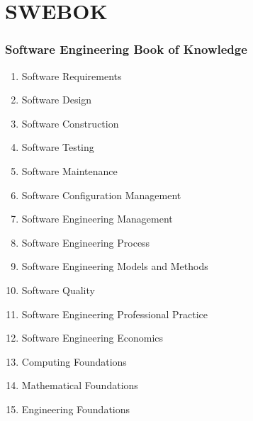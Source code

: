 \documentclass{../../slides-style}
\begin{document}
    \section{SWEBOK}

    \begin{frame}
        \frametitle{Software Engineering Book of Knowledge}
        \begin{footnotesize}
            \begin{enumerate}
                \item Software Requirements
                \item Software Design
                \item Software Construction
                \item Software Testing
                \item Software Maintenance
                \item Software Configuration Management
                \item Software Engineering Management
                \item Software Engineering Process
                \item Software Engineering Models and Methods
                \item Software Quality
                \item Software Engineering Professional Practice
                \item Software Engineering Economics
                \item Computing Foundations
                \item Mathematical Foundations
                \item Engineering Foundations
            \end{enumerate}
        \end{footnotesize}
    \end{frame}
\end{document}
